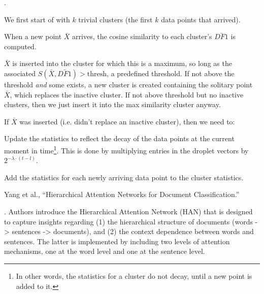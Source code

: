 \documentclass[11pt]{article}
\begin{document}
\myspace
\p {}. 
\begin{compactenum}
	\item We first start of with $k$ trivial clusters (the first $k$ data points that arrived). 
	
	\item When a new point $\bar{X}$ arrives, the cosine similarity to each cluster's $\bar{DF1}$ is computed. 
	
	\item $\bar{X}$ is inserted into the cluster for which this is a maximum, so long as the associated $S(\bar{X}, \bar{DF1}) > \mathrm{thresh}$, a predefined threshold. If not above the threshold \textit{and} some  exists, a new cluster is created containing the solitary point $\bar{X}$, which replaces the inactive cluster. If not above threshold but no inactive clusters, then we just insert it into the max similarity cluster anyway.
	
	\item If $\bar{X}$ was inserted (i.e. didn't replace an inactive cluster), then we need to:
	\begin{compactenum}
		\item Update the statistics to reflect the decay of the data points at the current moment in time\footnote{In other words, the statistics for a cluster do not decay, until a new point is added to it.}. This is done by multiplying entries in the droplet vectors by $2^{-\lambda \cdot (t - l)}$.
		
		\item Add the statistics for each newly arriving data point to the cluster statistics.
	\end{compactenum}
\end{compactenum}






\vspace{-1em}
{\footnotesize Yang et al., ``Hierarchical Attention Networks for Document Classification.''}

. Authors introduce the Hierarchical Attention Network (HAN) that is designed to capture insights regarding (1) the hierarchical structure of documents (words -> sentences -> documents), and (2) the context dependence between words and sentences. The latter is implemented by including two levels of attention mechanisms, one at the word level and one at the sentence level.
\end{document}
